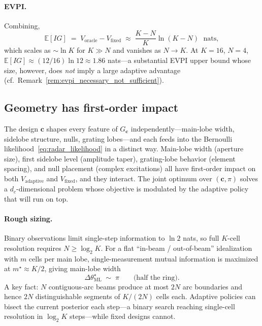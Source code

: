 \documentclass[11pt,a4paper]{article}
\newcommand{\E}{\mathbb{E}}
\begin{document}
\paragraph{EVPI.}  Combining,
\begin{equation}
  \boxed{\;\E[IG] \;=\; V_{\mathrm{oracle}} - V_{\mathrm{fixed}} \;\approx\; \frac{K - N}{K}\ln(K - N) \;\text{ nats},\;}
  \label{eq:radar_ig}
\end{equation}
which scales as $\sim \ln K$ for $K \gg N$ and vanishes as $N \to K$.  At $K = 16$, $N = 4$, $\E[IG] \approx (12/16)\ln 12 \approx 1.86$ nats---a substantial EVPI upper bound whose size, however, does \emph{not} imply a large adaptive advantage (cf.\ Remark~\ref{rem:evpi_necessary_not_sufficient}).

\subsection{Geometry has first-order impact}

The design $\bm{c}$ shapes every feature of $G_{\bm{c}}$ independently---main-lobe width, sidelobe structure, nulls, grating lobes---and each feeds into the Bernoulli likelihood~\eqref{eq:radar_likelihood} in a distinct way.  Main-lobe width (aperture size), first sidelobe level (amplitude taper), grating-lobe behavior (element spacing), and null placement (complex excitations) all have first-order impact on both $V_{\mathrm{adaptive}}$ and $V_{\mathrm{fixed}}$, and they interact.  The joint optimum over $(\bm{c}, \pi)$ solves a $d_c$-dimensional problem whose objective is modulated by the adaptive policy that will run on top.

\paragraph{Rough sizing.}
Binary observations limit single-step information to $\ln 2$ nats, so full $K$-cell resolution requires $N \ge \log_2 K$.  For a flat ``in-beam / out-of-beam'' idealization with $m$ cells per main lobe, single-measurement mutual information is maximized at $m^\star \approx K/2$, giving main-lobe width
\begin{equation}
  \Delta\theta_{\mathrm{ML}}^\star \;\sim\; \pi \qquad \text{(half the ring).}
  \label{eq:radar_width_scaling}
\end{equation}
A key fact: $N$ contiguous-arc beams produce at most $2N$ arc boundaries and hence $2N$ distinguishable segments of $K/(2N)$ cells each.  Adaptive policies can bisect the current posterior each step---a binary search reaching single-cell resolution in $\log_2 K$ steps---while fixed designs cannot.
\end{document}
